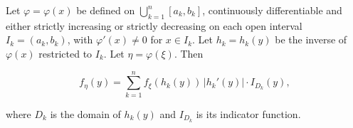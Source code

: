 Let $\varphi = \varphi(x)$ be defined on $\bigcup_{k=1}^{n} [a_k, b_k]$, continuously differentiable and either strictly increasing or strictly decreasing on each open interval $I_k = (a_k, b_k)$, with $\varphi'(x) \neq 0$ for $x \in I_k$. Let $h_k = h_k(y)$ be the inverse of $\varphi(x)$ restricted to $I_k$. Let $\eta = \varphi(\xi)$. Then

$$f_\eta(y) = \sum_{k=1}^{n} f_\xi(h_k(y)) \, |h_k'(y)| \cdot I_{D_k}(y),$$

where $D_k$ is the domain of $h_k(y)$ and $I_{D_k}$ is its indicator function.
